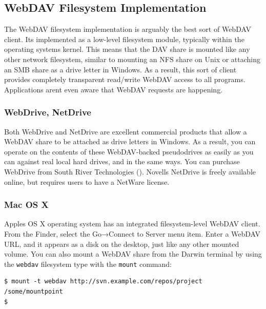 \subsection{WebDAV Filesystem
Implementation}\label{svn.webdav.clients.fs-impl}

The WebDAV filesystem implementation is arguably the best sort of WebDAV
client. It\textquotesingle s implemented as a low-level filesystem
module, typically within the operating system\textquotesingle s kernel.
This means that the DAV share is mounted like any other network
filesystem, similar to mounting an NFS share on Unix or attaching an SMB
share as a drive letter in Windows. As a result, this sort of client
provides completely transparent read/write WebDAV access to all
programs. Applications aren\textquotesingle t even aware that WebDAV
requests are happening.

\subsubsection{WebDrive,
NetDrive}\label{svn.webdav.clients.fs-impl.windows}

Both WebDrive and NetDrive are excellent commercial products that allow
a WebDAV share to be attached as drive letters in Windows. As a result,
you can operate on the contents of these WebDAV-backed pseudodrives as
easily as you can against real local hard drives, and in the same ways.
You can purchase WebDrive from South River Technologies
(\href{https://webdrive.com/}{}). Novell\textquotesingle s NetDrive is
freely available online, but requires users to have a NetWare license.

\subsubsection{Mac OS X}\label{svn.webdav.clients.fs-impl.macosx}

Apple\textquotesingle s OS X operating system has an integrated
filesystem-level WebDAV client. From the Finder, select the Go→Connect
to Server menu item. Enter a WebDAV URL, and it appears as a disk on the
desktop, just like any other mounted volume. You can also mount a WebDAV
share from the Darwin terminal by using the \texttt{webdav} filesystem
type with the \texttt{mount} command:

\begin{verbatim}
$ mount -t webdav http://svn.example.com/repos/project /some/mountpoint
$
\end{verbatim}

